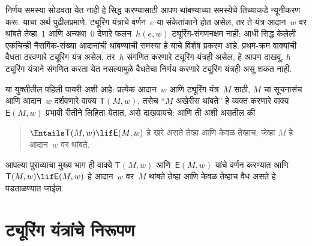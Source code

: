 निर्णय समस्या सोडवता येत नाही हे
सिद्ध करण्यासाठी आपण थांबण्याच्या
समस्येचे तिच्याकडे न्यूनीकरण करू.
याचा अर्थ पुढीलप्रमाणे. ट्यूरिंग
यंत्राचे वर्णन~$e$ या संकेतांकाने होत असेल,
तर ते यंत्र आदान~$w$ वर थांबते
तेव्हा~$1$ आणि अन्यथा~$0$ देणारे
फलन~$h(e,w)$ ट्यूरिंग-संगणनक्षम
नाही: आधी सिद्ध केलेली एकचिन्ही नैसर्गिक-संख्या आदानांची
थांबण्याची समस्या हे याचे विशेष प्रकरण आहे.
प्रथम-क्रम वाक्यांची वैधता ठरवणारे
ट्यूरिंग यंत्र असेल, तर~$h$ संगणित
करणारे ट्यूरिंग यंत्रही असेल, हे
आपण दाखवू. $h$ ट्यूरिंग यंत्राने
संगणित करता येत नसल्यामुळे वैधतेचा
निर्णय करणारे ट्यूरिंग यंत्रही असू
शकत नाही.

या युक्तीतील पहिली पायरी अशी आहे:
प्रत्येक आदान~$w$ आणि ट्यूरिंग
यंत्र~$M$ साठी, $M$ चा सूचनासंच
आणि आदान~$w$ दर्शवणारे
वाक्य $\mathsf{T}(M, w)$,
तसेच “$M$ अखेरीस थांबते”
हे व्यक्त करणारे वाक्य~$\mathsf{E}(M, w)$ प्रभावी रीतीने
लिहिता येतात, असे दाखवायचे;
आणि ती अशी असतील की
\begin{quote}
  $\Entails \mathsf{T}(M, w) \lif \mathsf{E}(M,w)$ हे खरे असते तेव्हा आणि केवळ तेव्हाच, जेव्हा $M$ हे आदान~$w$ वर थांबते.
\end{quote}
आपल्या पुराव्याचा मुख्य भाग ही
वाक्ये $\mathsf{T}(M, w)$ आणि~$\mathsf{E}(M, w)$
यांचे वर्णन करण्यात आणि
$\mathsf{T}(M, w) \lif \mathsf{E}(M, w)$ हे
आदान~$w$ वर~$M$ थांबते तेव्हा आणि केवळ तेव्हाच
वैध असते हे पडताळण्यात जाईल.











\section{ट्यूरिंग यंत्रांचे निरूपण}\label{tur:und:rep:sec}

